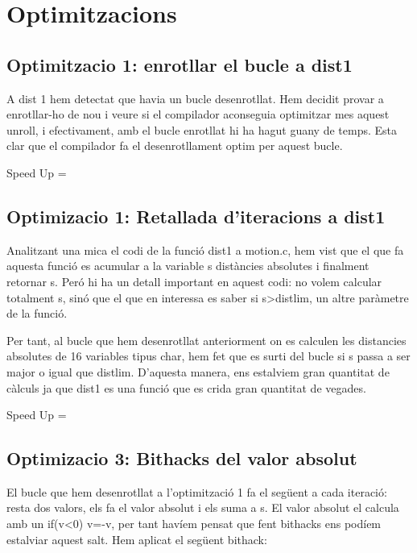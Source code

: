 

\chapter{Optimitzacions}

\section{Optimitzacio 1: enrotllar el bucle a dist1}

A dist 1 hem detectat que havia un bucle desenrotllat. Hem decidit provar a enrotllar-ho de nou i veure si el compilador aconseguia optimitzar mes aquest unroll, i efectivament, amb el bucle enrotllat hi ha hagut guany de temps. Esta clar que el compilador fa el desenrotllament optim per aquest bucle.

Speed Up = 

\section{Optimizacio 1: Retallada d'iteracions a dist1}

Analitzant una mica el codi de la funció dist1 a motion.c, hem vist que el que fa aquesta funció es acumular a la variable s distàncies absolutes i finalment retornar s. Peró hi ha un detall important en aquest codi: no volem calcular totalment s, sinó que el que en interessa es saber si s>distlim, un altre paràmetre de la funció.

Per tant, al bucle que hem desenrotllat anteriorment on es calculen les distancies absolutes de 16 variables tipus char, hem fet que es surti del bucle si s passa a ser major o igual que distlim. D'aquesta manera, ens estalviem gran quantitat de càlculs ja que dist1 es una funció que es crida gran quantitat de vegades.

Speed Up  =

\section{Optimizacio 3: Bithacks del valor absolut}

El bucle que hem desenrotllat a l'optimització 1 fa el següent a cada iteració: resta dos valors, els fa el valor absolut i els suma a s. El valor absolut el calcula amb un if(v<0) v=-v, per tant havíem pensat que fent bithacks ens podíem estalviar aquest salt. Hem aplicat el següent bithack:

